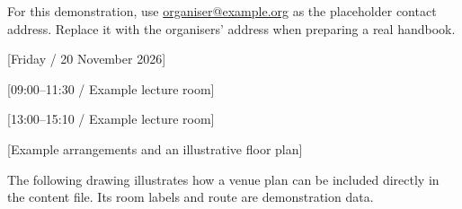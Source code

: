 \documentclass[a4paper,11pt,twoside]{article}
\begin{document}
For this demonstration, use \href{mailto:organiser@example.org}{organiser@example.org}
as the placeholder contact address. Replace it with the organisers' address
when preparing a real handbook.










\clearpage
{}[Friday / 20 November 2026]

[09:00--11:30 / Example lecture room]

[13:00--15:10 / Example lecture room]










\clearpage
{}











\clearpage
{}[Example arrangements and an illustrative floor plan]

The following drawing illustrates how a venue plan can be included directly in
the content file. Its room labels and route are demonstration data.
\end{document}
